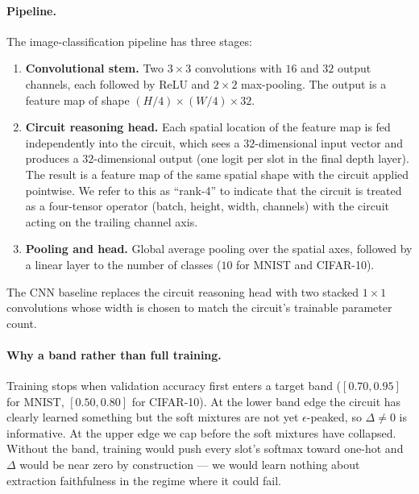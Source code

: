 \documentclass{article}
\begin{document}
\paragraph{Pipeline.}
The image-classification pipeline has three stages:
\begin{enumerate}
  \item \textbf{Convolutional stem.} Two $3 \times 3$ convolutions with $16$ and $32$ output channels, each followed by ReLU and $2 \times 2$ max-pooling. The output is a feature map of shape $(H/4) \times (W/4) \times 32$.
  \item \textbf{Circuit reasoning head.} Each spatial location of the feature map is fed independently into the circuit, which sees a $32$-dimensional input vector and produces a $32$-dimensional output (one logit per slot in the final depth layer). The result is a feature map of the same spatial shape with the circuit applied pointwise. We refer to this as ``rank-4'' to indicate that the circuit is treated as a four-tensor operator (batch, height, width, channels) with the circuit acting on the trailing channel axis.
  \item \textbf{Pooling and head.} Global average pooling over the spatial axes, followed by a linear layer to the number of classes ($10$ for MNIST and CIFAR-10).
\end{enumerate}
The CNN baseline replaces the circuit reasoning head with two stacked $1 \times 1$ convolutions whose width is chosen to match the circuit's trainable parameter count.

\paragraph{Why a band rather than full training.}
Training stops when validation accuracy first enters a target band ($[0.70, 0.95]$ for MNIST, $[0.50, 0.80]$ for CIFAR-10).
At the lower band edge the circuit has clearly learned something but the soft mixtures are not yet $\epsilon$-peaked, so $\Delta \ne 0$ is informative.
At the upper edge we cap before the soft mixtures have collapsed.
Without the band, training would push every slot's softmax toward one-hot and $\Delta$ would be near zero by construction --- we would learn nothing about extraction faithfulness in the regime where it could fail.
\end{document}
